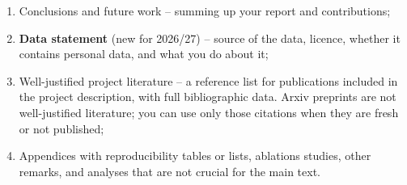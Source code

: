 \documentclass[11pt]{article}
\begin{document}
\begin{enumerate}
\item Conclusions and future work -- summing up your report and contributions;
\item \textbf{Data statement} (new for 2026/27) -- source of the data, licence, whether it contains personal data, and what you do about it;
\item Well-justified project literature -- a reference list for publications included in the project description, with full bibliographic data. Arxiv preprints are not well-justified literature; you can use only those citations when they are fresh or not published;
\item Appendices with reproducibility tables or lists, ablations studies, other remarks, and analyses that are not crucial for the main text.
\end{enumerate}



\end{document}
